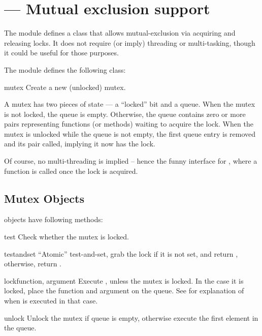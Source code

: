 \section{ ---
         Mutual exclusion support}


The  module defines a class that allows mutual-exclusion
via acquiring and releasing locks. It does not require (or imply)
threading or multi-tasking, though it could be useful for
those purposes.

The  module defines the following class:

\begin{classdesc}{mutex}{}
Create a new (unlocked) mutex.

A mutex has two pieces of state --- a ``locked'' bit and a queue.
When the mutex is not locked, the queue is empty.
Otherwise, the queue contains zero or more 
 pairs
representing functions (or methods) waiting to acquire the lock.
When the mutex is unlocked while the queue is not empty,
the first queue entry is removed and its 
 pair called,
implying it now has the lock.

Of course, no multi-threading is implied -- hence the funny interface
for , where a function is called once the lock is
acquired.
\end{classdesc}


\subsection{Mutex Objects \label{mutex-objects}}

 objects have following methods:

\begin{methoddesc}{test}{}
Check whether the mutex is locked.
\end{methoddesc}

\begin{methoddesc}{testandset}{}
``Atomic'' test-and-set, grab the lock if it is not set,
and return , otherwise, return .
\end{methoddesc}

\begin{methoddesc}{lock}{function, argument}
Execute , unless the mutex is locked.
In the case it is locked, place the function and argument on the queue.
See  for explanation of when
 is executed in that case.
\end{methoddesc}

\begin{methoddesc}{unlock}{}
Unlock the mutex if queue is empty, otherwise execute the first element
in the queue.
\end{methoddesc}

